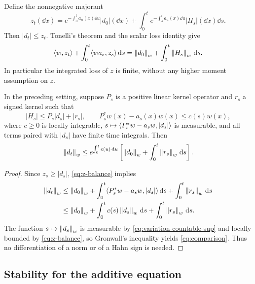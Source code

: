 Define the nonnegative majorant
\begin{equation}
 z_t(\dd x)=e^{-\int_0^t a_u(x)\dd u}|d_0|(\dd x)
   +\int_0^t e^{-\int_s^t a_u(x)\dd u}|H_s|(\dd x)\dd s.
 \label{eq:z-majorant}
\end{equation}
Then $|d_t|\leq z_t$. Tonelli's theorem and the scalar loss identity
give
\begin{equation}
 \langle w,z_t\rangle+\int_0^t\langle wa_s,z_s\rangle\,\mathrm d s
 =\left\lVert d_0\right\rVert_w+\int_0^t\left\lVert H_s\right\rVert_w\,\mathrm d s.
 \label{eq:z-balance}
\end{equation}
In particular the integrated loss of $z$ is finite, without any higher
moment assumption on $z$.

\begin{lemma}\label{lem:weighted-comparison}
In the preceding setting, suppose $P_s$ is a positive linear kernel
operator and $r_s$ a signed kernel such that
\begin{equation}
 |H_s|\leq P_s|d_s|+|r_s|,\qquad
 P_s^*w(x)-a_s(x)w(x)\leq c(s)w(x),
 \label{eq:comparison-assumptions}
\end{equation}
where $c\geq0$ is locally integrable, $s\mapsto\langle P_s^*w-a_sw,|d_s|\rangle$
is measurable, and all terms paired with $|d_s|$ have finite time
integrals. Then
\begin{equation}
 \left\lVert d_t\right\rVert_w\leq e^{\int_0^t c(u)\,\mathrm d u}
 \left[\left\lVert d_0\right\rVert_w+\int_0^t\left\lVert r_s\right\rVert_w\,\mathrm d s\right].
 \label{eq:comparison}
\end{equation}
\end{lemma}

\begin{proof}
Since $z_s\geq|d_s|$, \eqref{eq:z-balance} implies
\begin{align*}
 \left\lVert d_t\right\rVert_w
 &\leq\left\lVert d_0\right\rVert_w+
 \int_0^t\langle P_s^*w-a_sw,|d_s|\rangle\,\mathrm d s
 +\int_0^t\left\lVert r_s\right\rVert_w\,\mathrm d s\\
 &\leq\left\lVert d_0\right\rVert_w+
 \int_0^t c(s)\left\lVert d_s\right\rVert_w\,\mathrm d s+
 \int_0^t\left\lVert r_s\right\rVert_w\,\mathrm d s.
\end{align*}
The function $s\mapsto\left\lVert d_s\right\rVert_w$ is measurable by
\eqref{eq:variation-countable-sup} and locally bounded by
\eqref{eq:z-balance}, so Gronwall's inequality yields
\eqref{eq:comparison}.
Thus no differentiation of a norm or of a Hahn sign is needed.
\end{proof}

\subsection{Stability for the additive equation}

